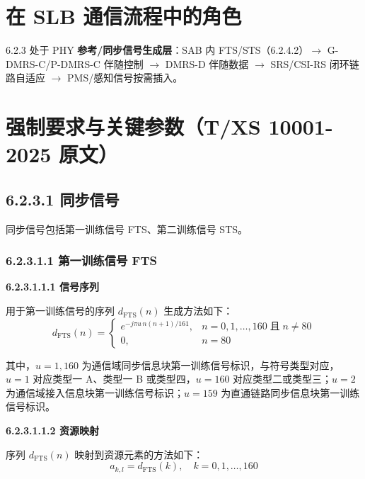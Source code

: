 \documentclass[11pt,a4paper]{ctexart}
\begin{document}
\section{在 SLB 通信流程中的角色}

6.2.3 处于 PHY \textbf{参考/同步信号生成层}：SAB 内 FTS/STS（6.2.4.2）$\rightarrow$ G-DMRS-C/P-DMRS-C 伴随控制 $\rightarrow$ DMRS-D 伴随数据 $\rightarrow$ SRS/CSI-RS 闭环链路自适应 $\rightarrow$ PMS/感知信号按需插入。

\section{强制要求与关键参数（T/XS 10001-2025 原文）}

\subsection{6.2.3.1 同步信号}

同步信号包括第一训练信号 FTS、第二训练信号 STS。

\subsubsection{6.2.3.1.1 第一训练信号 FTS}

\textbf{6.2.3.1.1.1 信号序列}

用于第一训练信号的序列 $d_{\mathrm{FTS}}(n)$ 生成方法如下：
\begin{equation}
d_{\mathrm{FTS}}(n) =
\begin{cases}
e^{-j\pi u\, n (n+1) / 161}, & n = 0, 1, \ldots, 160 \;\text{且}\; n \neq 80 \\[0.3em]
0, & n = 80
\end{cases}
\end{equation}

其中，$u = 1, 160$ 为通信域同步信息块第一训练信号标识，与符号类型对应，$u = 1$ 对应类型一 A、类型一 B 或类型四，$u = 160$ 对应类型二或类型三；$u = 2$ 为通信域接入信息块第一训练信号标识；$u = 159$ 为直通链路同步信息块第一训练信号标识。

\textbf{6.2.3.1.1.2 资源映射}

序列 $d_{\mathrm{FTS}}(n)$ 映射到资源元素的方法如下：
\begin{equation}
a_{k,l} = d_{\mathrm{FTS}}(k), \quad k = 0, 1, \ldots, 160
\end{equation}
\end{document}
